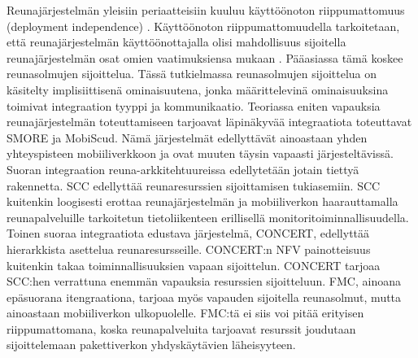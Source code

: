 Reunajärjestelmän yleisiin periaatteisiin kuuluu käyttöönoton riippumattomuus (deployment independence) \cite{etsitechreq}.
Käyttöönoton riippumattomuudella tarkoitetaan, että reunajärjestelmän käyttöönottajalla olisi mahdollisuus sijoitella reunajärjestelmän osat omien vaatimuksiensa mukaan \cite{etsitechreq}. Pääasiassa tämä koskee reunasolmujen sijoittelua. Tässä tutkielmassa reunasolmujen sijoittelua on käsitelty implisiittisenä ominaisuutena, jonka määrittelevinä ominaisuuksina toimivat integraation tyyppi ja kommunikaatio. 
Teoriassa eniten vapauksia reunajärjestelmän toteuttamiseen tarjoavat läpinäkyvää integraatiota toteuttavat SMORE ja MobiScud.
Nämä järjestelmät edellyttävät ainoastaan yhden yhteyspisteen mobiiliverkkoon ja ovat muuten täysin vapaasti järjesteltävissä.
Suoran integraation reuna-arkkitehtuureissa edellytetään jotain tiettyä rakennetta. 
SCC edellyttää reunaresurssien sijoittamisen tukiasemiin. SCC kuitenkin loogisesti erottaa reunajärjestelmän ja mobiiliverkon haarauttamalla reunapalveluille tarkoitetun tietoliikenteen erillisellä monitoritoiminnallisuudella.
Toinen suoraa integraatiota edustava järjestelmä, CONCERT, edellyttää hierarkkista asettelua reunaresursseille. CONCERT:n NFV painotteisuus kuitenkin takaa toiminnallisuuksien vapaan sijoittelun. CONCERT tarjoaa SCC:hen verrattuna enemmän vapauksia resurssien sijoitteluun.
FMC, ainoana epäsuorana itengraationa, tarjoaa myös vapauden sijoitella reunasolmut, mutta ainoastaan mobiiliverkon ulkopuolelle.
FMC:tä ei siis voi pitää erityisen riippumattomana, koska reunapalveluita tarjoavat resurssit joudutaan sijoittelemaan pakettiverkon yhdyskäytävien läheisyyteen.

